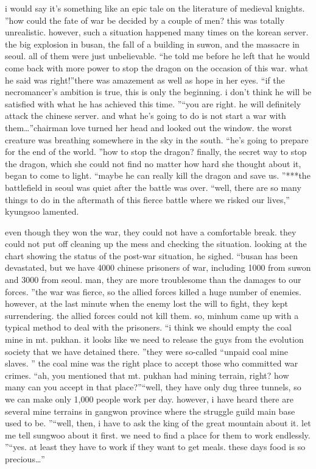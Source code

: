  i would say it’s something like an epic tale on the literature of medieval knights.
”how could the fate of war be decided by a couple of men? this was totally unrealistic.
however, such a situation happened many times on the korean server.
 the big explosion in busan, the fall of a building in suwon, and the massacre in seoul.
 all of them were just unbelievable.
“he told me before he left that he would come back with more power to stop the dragon on the occasion of this war.
 what he said was right!”there was amazement as well as hope in her eyes.
“if the necromancer’s ambition is true, this is only the beginning.
 i don’t think he will be satisfied with what he has achieved this time.
”“you are right.
 he will definitely attack the chinese server.
 and what he’s going to do is not start a war with them…”chairman love turned her head and looked out the window.
 the worst creature was breathing somewhere in the sky in the south.
“he’s going to prepare for the end of the world.
”how to stop the dragon? finally, the secret way to stop the dragon, which she could not find no matter how hard she thought about it, began to come to light.
“maybe he can really kill the dragon and save us.
”***the battlefield in seoul was quiet after the battle was over.
“well, there are so many things to do in the aftermath of this fierce battle where we risked our lives,” kyungsoo lamented.


even though they won the war, they could not have a comfortable break.
they could not put off cleaning up the mess and checking the situation.
looking at the chart showing the status of the post-war situation, he sighed.
“busan has been devastated, but we have 4000 chinese prisoners of war, including 1000 from suwon and 3000 from seoul.
 man, they are more troublesome than the damages to our forces.
”the war was fierce, so the allied forces killed a huge number of enemies.
 however, at the last minute when the enemy lost the will to fight, they kept surrendering.
 the allied forces could not kill them.
so, minhum came up with a typical method to deal with the prisoners.
“i think we should empty the coal mine in mt.
 pukhan.
 it looks like we need to release the guys from the evolution society that we have detained there.
”they were so-called “unpaid coal mine slaves.
” the coal mine was the right place to accept those who committed war crimes.
“ah, you mentioned that mt.
 pukhan had mining terrain, right? how many can you accept in that place?”“well, they have only dug three tunnels, so we can make only 1,000 people work per day.
 however, i have heard there are several mine terrains in gangwon province where the struggle guild main base used to be.
”“well, then, i have to ask the king of the great mountain about it.
 let me tell sungwoo about it first.
 we need to find a place for them to work endlessly.
”“yes.
 at least they have to work if they want to get meals.
 these days food is so precious…”

 